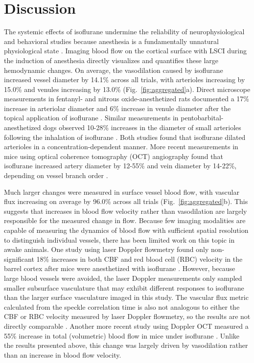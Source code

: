 \documentclass[review]{elsarticle}
\begin{document}
\section{Discussion}

The systemic effects of isoflurane undermine the reliability of neurophysiological and behavioral studies because anesthesia is a fundamentally unnatural physiological state \cite{Gao:2017tw}. Imaging blood flow on the cortical surface with LSCI during the induction of anesthesia directly visualizes and quantifies these large hemodynamic changes. On average, the vasodilation caused by isoflurane increased vessel diameter by 14.1\% across all trials, with arterioles increasing by 15.0\% and venules increasing by 13.0\% (Fig.~\ref{fig:aggregated}a). Direct microscope measurements in fentanyl- and nitrous oxide-anesthetized rats documented a 17\% increase in arteriolar diameter and 6\% increase in venule diameter after the topical application of isoflurane \cite{Koenig:1994rn}. Similar measurements in pentobarbital-anesthetized dogs observed 10-28\% increases in the diameter of small arterioles following the inhalation of isoflurane \cite{Iida:1998th}. Both studies found that isoflurane dilated arterioles in a concentration-dependent manner. More recent measurements in mice using optical coherence tomography (OCT) angiography found that isoflurane increased artery diameter by 12-55\% and vein diameter by 14-22\%, depending on vessel branch order \cite{Rakymzhan.2021}.

Much larger changes were measured in surface vessel blood flow, with vascular flux increasing on average by 96.0\% across all trials (Fig.~\ref{fig:aggregated}b). This suggests that increases in blood flow velocity rather than vasodilation are largely responsible for the measured change in flow. Because few imaging modalities are capable of measuring the dynamics of blood flow with sufficient spatial resolution to distinguish individual vessels, there has been limited work on this topic in awake animals. One study using laser Doppler flowmetry found only non-significant 18\% increases in both CBF and red blood cell (RBC) velocity in the barrel cortex after mice were anesthetized with isoflurane \cite{Takuwa:2012ee}. However, because large blood vessels were avoided, the laser Doppler measurements only sampled smaller subsurface vasculature that may exhibit different responses to isoflurane than the larger surface vasculature imaged in this study. The vascular flux metric calculated from the speckle correlation time is also not analogous to either the CBF or RBC velocity measured by laser Doppler flowmetry, so the results are not directly comparable \cite{Kazmi:2015du}. Another more recent study using Doppler OCT measured a 55\% increase in total (volumetric) blood flow in mice under isoflurane \cite{Rakymzhan.2021}. Unlike the results presented above, this change was largely driven by vasodilation rather than an increase in blood flow velocity.
\end{document}
